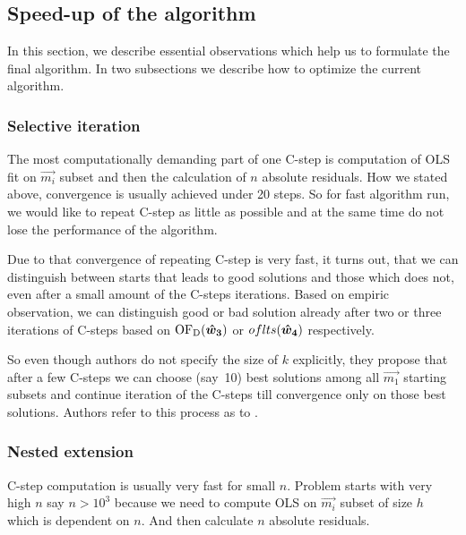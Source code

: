 
\subsection{Speed-up of the algorithm}
In this section, we describe essential observations which help us to formulate the final algorithm. In two subsections we describe how to optimize the current algorithm. 

\subsubsection*{Selective iteration}
The most computationally demanding part of one C-step is computation of OLS fit on $\vec{m_i}$ subset and then the calculation of $n$ absolute residuals. How we stated above, convergence is usually achieved under 20 steps. So for fast algorithm run, we would like to repeat C-step as little as possible and at the same time do not lose the performance of the algorithm. 

Due to that convergence of repeating C-step is very fast, it turns out, that we can distinguish between starts that leads to good solutions and those which does not, even after a small amount of the C-steps iterations. Based on empiric observation, we can distinguish good or bad solution already after two or three iterations of C-steps based on $\operatorname{OF_D}(\boldsymbol{\hat{w}_3})$ or $oflts(\boldsymbol{\hat{w}_4})$ respectively. 

So even though authors do not specify the size of $k$ explicitly, they propose that after a few C-steps we can choose (say~10) best solutions among all $\vec{m_1}$ starting subsets and continue iteration of the C-steps till convergence only on those best solutions.
Authors refer to this process as to .

\subsubsection*{Nested extension}
C-step computation is usually very fast for small $n$. Problem starts with very high $n$ say $n > 10^3$ because we need to compute OLS on $\vec{m_i}$ subset of size $h$ which is dependent on $n$. And then calculate $n$ absolute residuals.

